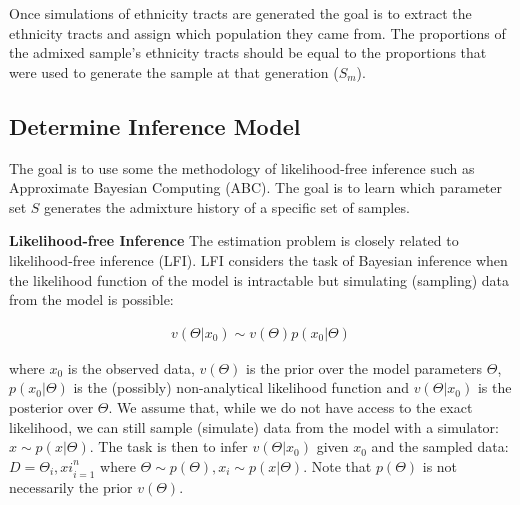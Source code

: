 \documentclass[./main.tex]{subfiles}
\begin{document}
Once simulations of ethnicity tracts are generated the goal is to extract the ethnicity tracts and assign which population they came from.   The proportions of the admixed sample's ethnicity tracts should be equal to the proportions that were used to generate the sample at that generation ($S_m$).

\subsection{Determine Inference Model}

The goal is to use some the methodology of likelihood-free inference such as Approximate Bayesian Computing (ABC).  The goal is to learn which parameter set $S$ generates the admixture history of a specific set of samples.

\textbf{Likelihood-free Inference} The estimation problem is closely related to likelihood-free inference (LFI). LFI considers the task of Bayesian inference when the likelihood function of the model is intractable but simulating (sampling) data from the model is possible:

\begin{equation*}
\begin{gathered}
v(\Theta|x_{0}) \sim v(\Theta)p(x_{0}|\Theta)
\end{gathered}
\end{equation*}

where $x_{0}$ is the observed data, $v(\Theta)$ is the prior over the model parameters $\Theta$, $p(x_{0}|\Theta)$ is the (possibly) non-analytical likelihood function and $v(\Theta|x_{0})$ is the posterior over $\Theta$. We assume that, while we do not have access to the exact likelihood, we can still sample (simulate) data from the model with a simulator: $x \sim p(x|\Theta)$. The task is then to infer $v(\Theta|x_{0})$ given $x_{0}$ and the sampled data: $D = {\Theta_i, xi}^{n}_{i=1}$ where $\Theta \sim p(\Theta), x_i \sim p(x|\Theta)$.  Note that $p(\Theta)$ is not necessarily the prior $v(\Theta)$.
\end{document}
